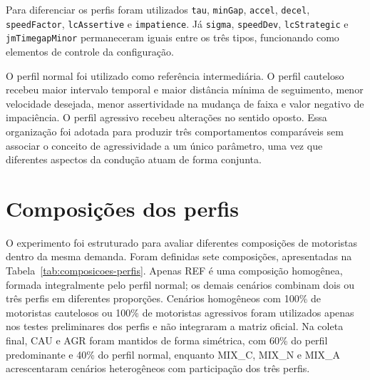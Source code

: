 Para diferenciar os perfis foram utilizados \texttt{tau}, \texttt{minGap}, \texttt{accel}, \texttt{decel}, \texttt{speedFactor}, \texttt{lcAssertive} e \texttt{impatience}. Já \texttt{sigma}, \texttt{speedDev}, \texttt{lcStrategic} e \texttt{jmTimegapMinor} permaneceram iguais entre os três tipos, funcionando como elementos de controle da configuração.

O perfil normal foi utilizado como referência intermediária. O perfil cauteloso recebeu maior intervalo temporal e maior distância mínima de seguimento, menor velocidade desejada, menor assertividade na mudança de faixa e valor negativo de impaciência. O perfil agressivo recebeu alterações no sentido oposto. Essa organização foi adotada para produzir três comportamentos comparáveis sem associar o conceito de agressividade a um único parâmetro, uma vez que diferentes aspectos da condução atuam de forma conjunta.

\section{Composições dos perfis}

O experimento foi estruturado para avaliar diferentes composições de motoristas dentro da mesma demanda. Foram definidas sete composições, apresentadas na Tabela~\ref{tab:composicoes-perfis}. Apenas REF é uma composição homogênea, formada integralmente pelo perfil normal; os demais cenários combinam dois ou três perfis em diferentes proporções. Cenários homogêneos com 100\% de motoristas cautelosos ou 100\% de motoristas agressivos foram utilizados apenas nos testes preliminares dos perfis e não integraram a matriz oficial. Na coleta final, CAU e AGR foram mantidos de forma simétrica, com 60\% do perfil predominante e 40\% do perfil normal, enquanto MIX\_C, MIX\_N e MIX\_A acrescentaram cenários heterogêneos com participação dos três perfis.


